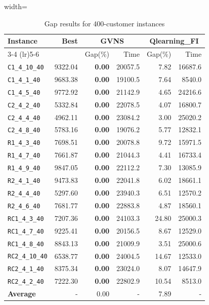 \begin{table}[ht]
\centering
\small
\setlength{\tabcolsep}{5pt}
\caption{Gap results for 400-customer instances}
\vspace{4mm}
\begin{adjustbox}{width=\textwidth}
\begin{tabular}{l r r r @{\hspace{8pt}} r r @{\hspace{8pt}}}
\toprule
\multirow{2}{*}{Instance} & \multirow{2}{*}{Best} & \multicolumn{2}{c}{GVNS} & \multicolumn{2}{c}{Qlearning\_FI} \\
\cmidrule(lr){3-4} \cmidrule(lr){5-6}
 &  & Gap(\%) & Time & Gap(\%) & Time \\
\midrule
\texttt{C1\_4\_10\_40} & 9322.04 & \textbf{0.00} & 20057.5 & 7.82 & 16687.6 \\
\texttt{C1\_4\_1\_40} & 9683.38 & \textbf{0.00} & 19100.5 & 7.64 & 8540.0 \\
\texttt{C1\_4\_5\_40} & 9772.92 & \textbf{0.00} & 21142.9 & 4.65 & 24216.6 \\
\texttt{C2\_4\_2\_40} & 5332.84 & \textbf{0.00} & 22078.5 & 4.07 & 16800.7 \\
\texttt{C2\_4\_4\_40} & 4962.11 & \textbf{0.00} & 23084.2 & 3.00 & 25020.2 \\
\texttt{C2\_4\_8\_40} & 5783.16 & \textbf{0.00} & 19076.2 & 5.77 & 12832.1 \\
\texttt{R1\_4\_3\_40} & 7698.51 & \textbf{0.00} & 20078.8 & 9.72 & 15971.5 \\
\texttt{R1\_4\_7\_40} & 7661.87 & \textbf{0.00} & 21044.3 & 4.41 & 16733.4 \\
\texttt{R1\_4\_9\_40} & 9847.05 & \textbf{0.00} & 22112.2 & 7.30 & 13085.9 \\
\texttt{R2\_4\_1\_40} & 9473.83 & \textbf{0.00} & 22041.8 & 6.02 & 18661.1 \\
\texttt{R2\_4\_4\_40} & 5297.60 & \textbf{0.00} & 23940.3 & 6.51 & 12570.2 \\
\texttt{R2\_4\_6\_40} & 7681.77 & \textbf{0.00} & 22883.8 & 4.87 & 18560.1 \\
\texttt{RC1\_4\_3\_40} & 7207.36 & \textbf{0.00} & 24103.3 & 24.80 & 25000.3 \\
\texttt{RC1\_4\_7\_40} & 9225.41 & \textbf{0.00} & 20156.5 & 8.67 & 12529.0 \\
\texttt{RC1\_4\_8\_40} & 8843.13 & \textbf{0.00} & 21009.9 & 3.51 & 25000.6 \\
\texttt{RC2\_4\_10\_40} & 6538.77 & \textbf{0.00} & 24004.5 & 14.67 & 12533.0 \\
\texttt{RC2\_4\_1\_40} & 8375.34 & \textbf{0.00} & 23024.0 & 8.07 & 14647.9 \\
\texttt{RC2\_4\_2\_40} & 7222.30 & \textbf{0.00} & 22802.9 & 10.54 & 8513.0 \\
\midrule
\textbf{Average} & - & 0.00 & - & 7.89 & - \\
\bottomrule
\end{tabular}
\end{adjustbox}
\end{table}